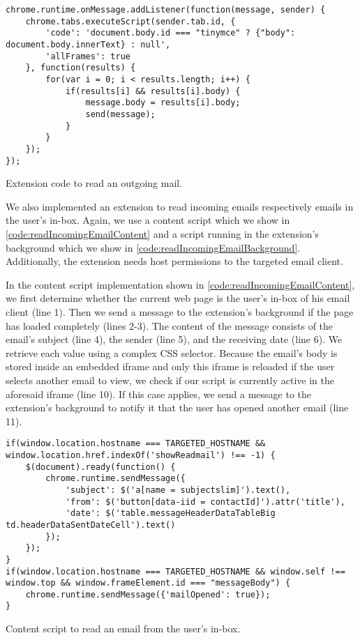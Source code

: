 	\begin{code}
		\begin{lstlisting}
chrome.runtime.onMessage.addListener(function(message, sender) {
	chrome.tabs.executeScript(sender.tab.id, {
		'code': 'document.body.id === "tinymce" ? {"body": document.body.innerText} : null',
		'allFrames': true
	}, function(results) {
		for(var i = 0; i < results.length; i++) {
			if(results[i] && results[i].body) {
				message.body = results[i].body;
				send(message);
			}
		}
	});
});
\end{lstlisting}
		\caption{Extension code to read an outgoing mail.}
		\label{code:readOutgoingEmailBackground}
	\end{code}
	
	We also implemented an extension to read incoming emails respectively emails in the user's in-box. Again, we use a content script which we show in \autoref{code:readIncomingEmailContent} and a script running in the extension's background which we show in \autoref{code:readIncomingEmailBackground}. Additionally, the extension needs host permissions to the targeted email client. 
	
	In the content script implementation shown in \autoref{code:readIncomingEmailContent}, we first determine whether the current web page is the user's in-box of his email client (line 1). Then we send a message to the extension's background if the page has loaded completely (lines 2-3). The content of the message consists of the email's subject (line 4), the sender (line 5), and the receiving date (line 6). We retrieve each value using a complex CSS selector. Because the email's body is stored inside an embedded iframe and only this iframe is reloaded if the user selects another email to view, we check if our script is currently active in the aforesaid iframe (line 10). If this case applies, we send a message to the extension's background to notify it that the user has opened another email (line 11).
	
	\begin{code}
		\begin{lstlisting}
if(window.location.hostname === TARGETED_HOSTNAME && window.location.href.indexOf('showReadmail') !== -1) {
	$(document).ready(function() {
		chrome.runtime.sendMessage({
			'subject': $('a[name = subjectslim]').text(),
			'from': $('button[data-iid = contactId]').attr('title'),
			'date': $('table.messageHeaderDataTableBig td.headerDataSentDateCell').text()
		});
	});
}
if(window.location.hostname === TARGETED_HOSTNAME && window.self !== window.top && window.frameElement.id === "messageBody") {
	chrome.runtime.sendMessage({'mailOpened': true});
}
\end{lstlisting}	
		\caption{Content script to read an email from the user's in-box.}
		\label{code:readIncomingEmailContent}
	\end{code}
	
